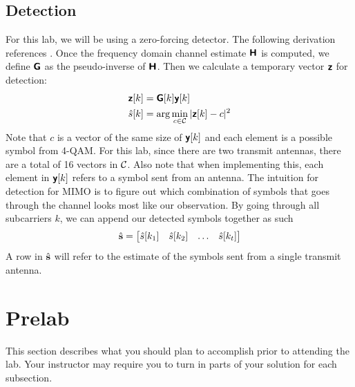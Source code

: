 \documentclass{book}
\begin{document}
\subsection{Detection}
For this lab, we will be using a zero-forcing detector. The following derivation references \cite[Chapter 6, Section 5.2]{Hea:Introduction-to-Wireless-Digital:17}. Once the frequency domain channel estimate $\bm{\mathsf{H}}$ is computed, we define $\bm{\mathsf{G}}$ as the pseudo-inverse of $\bm{\mathsf{H}}$. Then we calculate a temporary vector ${\bm{\mathsf{z}}}$ for detection:
\begin{align}
    {\bm{\mathsf{z}}}[k] &= \bm{\mathsf{G}}[k]{\bm{\mathsf{y}}}[k] \\
    \hat{s}[k] &= \arg \min_{c \in \mathcal{C}} |{\bm{\mathsf{z}}}[k] - c|^2
\end{align}
Note that $c$ is a vector of the same size of ${\bm{\mathsf{y}}}[k]$ and each element is a possible symbol from 4-QAM. For this lab, since there are two transmit antennas, there are a total of 16 vectors in $\mathcal{C}$. Also note that when implementing this, each element in ${\bm{\mathsf{y}}}[k]$ refers to a symbol sent from an antenna. The intuition for detection for MIMO is to figure out which combination of symbols that goes through the channel looks most like our observation. By going through all subcarriers $k$, we can append our detected symbols together as such
    \begin{equation}
        \hat{{\mathbf{s}}} = \begin{bmatrix}
            \hat{s}[k_1] & \hat{s}[k_2] & \hdots & \hat{s}[k_t]
        \end{bmatrix}
    \end{equation}
A row in $\hat{{\mathbf{s}}}$ will refer to the estimate of the symbols sent from a single transmit antenna.
\section{Prelab}

This section describes what you should plan to accomplish prior to attending the lab. Your instructor may require you to turn in parts of your solution for each subsection. 

\end{document}
